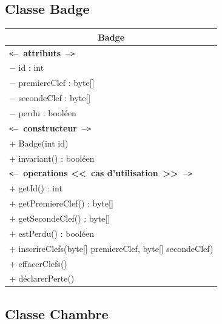 \documentclass[11pt,article]{article}
\newcommand{\cmt}[1]{\texttt{<}\textbf{--~#1~--}\texttt{>}}
\begin{document}
\subsection{Classe \textsf{Badge}}

\begin{center}
\begin{longtable}{|p{15cm}|}
\hline
\multicolumn{1}{|c|}{{\Large \textsf{Badge}}} \\
\hline
\cmt{attributs}\\
$-$ id : int \\
$-$ premiereClef : byte[] \\
$-$ secondeClef : byte[] \\
$-$ perdu : booléen \\
\hline
\cmt{constructeur} \\
$+$ Badge(int id)\\
$+$ invariant() : booléen\\
\cmt{operations <<~cas d'utilisation~>>} \\
$+$ getId() : int \\
$+$ getPremiereClef() : byte[] \\
$+$ getSecondeClef() : byte[] \\
$+$ estPerdu() : booléen \\
$+$ inscrireClefs(byte[] premiereClef, byte[] secondeClef) \\
$+$ effacerClefs() \\
$+$ déclarerPerte() \\
\hline
\end{longtable}
\end{center}

\subsection{Classe \textsf{Chambre}}
\end{document}
